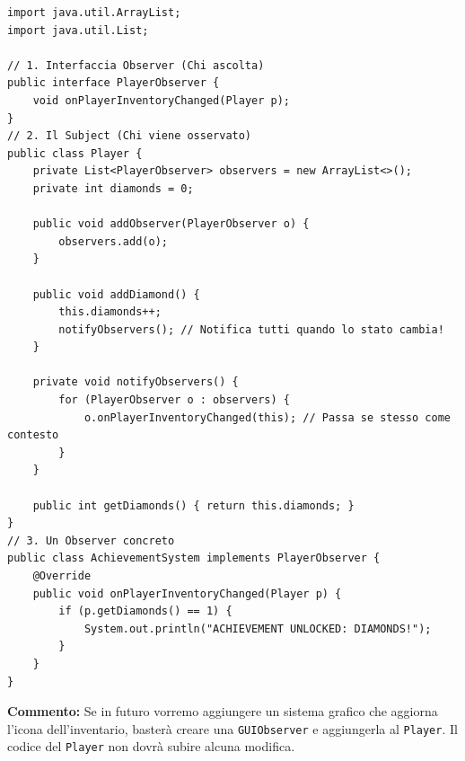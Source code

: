 \documentclass[12pt, a4paper]{article}
\begin{document}
\begin{verbatim}
import java.util.ArrayList;
import java.util.List;

// 1. Interfaccia Observer (Chi ascolta)
public interface PlayerObserver {
    void onPlayerInventoryChanged(Player p);
}
// 2. Il Subject (Chi viene osservato)
public class Player {
    private List<PlayerObserver> observers = new ArrayList<>();
    private int diamonds = 0;

    public void addObserver(PlayerObserver o) {
        observers.add(o);
    }

    public void addDiamond() {
        this.diamonds++;
        notifyObservers(); // Notifica tutti quando lo stato cambia!
    }

    private void notifyObservers() {
        for (PlayerObserver o : observers) {
            o.onPlayerInventoryChanged(this); // Passa se stesso come contesto
        }
    }
    
    public int getDiamonds() { return this.diamonds; }
}
// 3. Un Observer concreto
public class AchievementSystem implements PlayerObserver {
    @Override
    public void onPlayerInventoryChanged(Player p) {
        if (p.getDiamonds() == 1) {
            System.out.println("ACHIEVEMENT UNLOCKED: DIAMONDS!");
        }
    }
}
\end{verbatim}
\textbf{Commento:} Se in futuro vorremo aggiungere un sistema grafico che aggiorna l'icona dell'inventario, basterà creare una \texttt{GUIObserver} e aggiungerla al \texttt{Player}. Il codice del \texttt{Player} non dovrà subire alcuna modifica.
\end{document}
